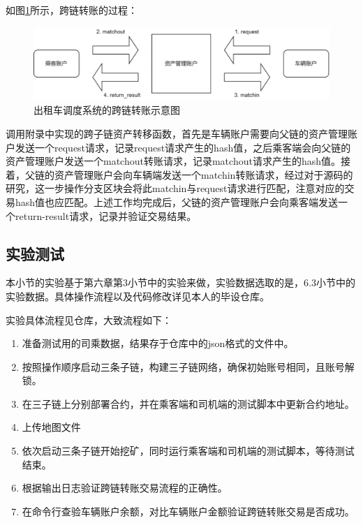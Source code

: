 如图\ref{fig:出租车调度系统的跨链转账示意图}所示，跨链转账的过程：

\begin{figure}
	\centering
	\includegraphics[width=\textwidth]{figures/出租车调度系统的跨链转账示意图.png}
	\caption{出租车调度系统的跨链转账示意图}
	\label{fig:出租车调度系统的跨链转账示意图}
\end{figure}

调用附录中实现的跨子链资产转移函数，首先是车辆账户需要向父链的资产管理账户发送一个request请求，记录request请求产生的hash值，之后乘客端会向父链的资产管理账户发送一个matchout转账请求，记录matchout请求产生的hash值。接着，父链的资产管理账户会向车辆端发送一个matchin转账请求，经过对于源码的研究，这一步操作分支区块会将此matchin与request请求进行匹配，注意对应的交易hash值也应匹配。上述工作均完成后，父链的资产管理账户会向乘客端发送一个return-result请求，记录并验证交易结果。

\subsection{实验测试}

本小节的实验基于第六章第3小节中的实验来做，实验数据选取的是，6.3小节中的实验数据。具体操作流程以及代码修改详见本人的毕设仓库。

实验具体流程见仓库，大致流程如下：

\begin{enumerate}
    \item 准备测试用的司乘数据，结果存于仓库中的json格式的文件中。
    \item 按照操作顺序启动三条子链，构建三子链网络，确保初始账号相同，且账号解锁。
    \item 在三子链上分别部署合约，并在乘客端和司机端的测试脚本中更新合约地址。
    \item 上传地图文件
    \item 依次启动三条子链开始挖矿，同时运行乘客端和司机端的测试脚本，等待测试结束。
    \item 根据输出日志验证跨链转账交易流程的正确性。
    \item 在命令行查验车辆账户余额，对比车辆账户金额验证跨链转账交易是否成功。
\end{enumerate}

